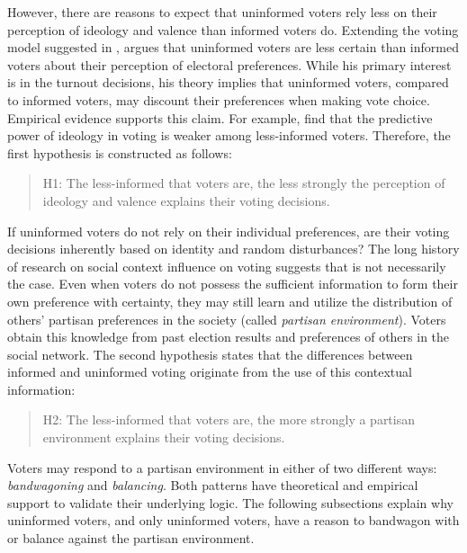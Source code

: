 \documentclass[letterpaper, 12pt]{article}
\begin{document}
    \par However, there are reasons to expect that uninformed voters rely less on their perception of ideology and valence than informed voters do. Extending the voting model suggested in \cite{Downs1957anec}, \cite{Matsusaka1995exvo} argues that uninformed voters are less certain than informed voters about their perception of electoral preferences. While his primary interest is in the turnout decisions, his theory implies that uninformed voters, compared to informed voters, may discount their preferences when making vote choice. Empirical evidence supports this claim. For example, \cite{Dellicarpini1996wham} find that the predictive power of ideology in voting is weaker among less-informed voters. Therefore, the first hypothesis is constructed as follows:

    \begin{verse}
        H1: The less-informed that voters are, the less strongly the perception of ideology and valence explains their voting decisions.
    \end{verse}

    \par If uninformed voters do not rely on their individual preferences, are their voting decisions inherently based on identity and random disturbances? The long history of research on social context influence on voting suggests that is not necessarily the case. Even when voters do not possess the sufficient information to form their own preference with certainty, they may still learn and utilize the distribution of others' partisan preferences in the society (called \textit{partisan environment}). Voters obtain this knowledge from past election results and preferences of others in the social network. The second hypothesis states that the differences between informed and uninformed voting originate from the use of this contextual information:

    \begin{verse}
        H2: The less-informed that voters are, the more strongly a partisan environment explains their voting decisions. 
    \end{verse}

    \noindent Voters may respond to a partisan environment in either of two different ways: \textit{bandwagoning} and \textit{balancing}. Both patterns have theoretical and empirical support to validate their underlying logic. The following subsections explain why uninformed voters, and only uninformed voters, have a reason to bandwagon with or balance against the partisan environment.
\end{document}
